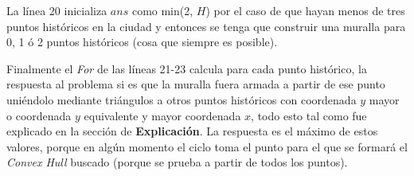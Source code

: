 La línea 20 inicializa $ans$ como min(2, $H$) por el caso de que hayan menos de tres puntos históricos en la ciudad
y entonces se tenga que construir una muralla para 0, 1 ó 2 puntos históricos (cosa que siempre es posible).

Finalmente el \textit{For} de las líneas 21-23 calcula para cada punto histórico, la respuesta al problema
si es que la muralla fuera armada a partir de ese punto uniéndolo mediante triángulos a otros puntos históricos
con coordenada $y$ mayor o coordenada $y$ equivalente y mayor coordenada $x$, todo esto tal como fue explicado
en la sección de \textbf{Explicación}. La respuesta es el máximo de estos valores, porque en algún momento el ciclo
toma el punto para el que se formará el \textit{Convex Hull} buscado (porque se prueba a partir de todos los puntos).

\bigskip

